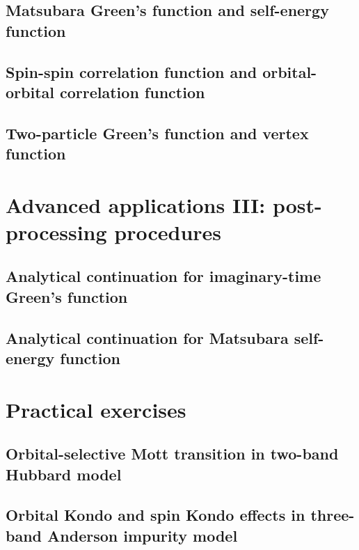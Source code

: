 \subsection{Matsubara Green's function and self-energy function}
\subsection{Spin-spin correlation function and orbital-orbital correlation function}
\subsection{Two-particle Green's function and vertex function}
\section{Advanced applications III: post-processing procedures}
\subsection{Analytical continuation for imaginary-time Green's function}
\subsection{Analytical continuation for Matsubara self-energy function}
\section{Practical exercises}
\subsection{Orbital-selective Mott transition in two-band Hubbard model}
\subsection{Orbital Kondo and spin Kondo effects in three-band Anderson impurity model}
